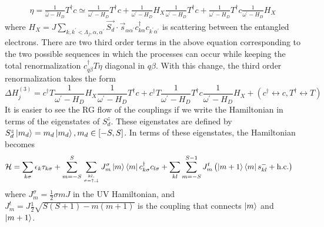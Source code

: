 \documentclass[reprint,prb,superscriptaddress]{revtex4-2}
\begin{document}
\begin{widetext}
\begin{equation}\begin{aligned}
	\eta = \frac{1}{\hat \omega - H_D}T^\dagger c \simeq \frac{1}{\omega^\prime - H_D}T^\dagger c + \frac{1}{\omega^\prime - H_D}H_X \frac{1}{\omega^\prime - H_D} T^\dagger c + \frac{1}{\omega^\prime - H_D} T^\dagger c \frac{1}{\omega^\prime - H_D} H_X
\end{aligned}\end{equation}
where \(H_X = J \sum_{k,k^\prime < \Lambda_j, \alpha,\alpha^\prime}\vec{S_d}\cdot\vec{s}_{\alpha \alpha^\prime}c^\dagger_{k\alpha}c_{k^\prime\alpha^\prime}\) is scattering between the entangled electrons. There are two third order terms in the above equation corresponding to the two possible sequences in which the processes can occur while keeping the total renormalization \(c^\dagger_{q\beta}T \eta\) diagonal in \(q\beta\). With this change, the third order renormalization takes the form
\begin{equation}
	\Delta H^{(3)}_j = c^\dagger T \frac{1}{\omega^\prime - H_D} H_X \frac{1}{\omega^\prime - H_D} T^\dagger c + c^\dagger T \frac{1}{\omega^\prime - H_D} T^\dagger c \frac{1}{\omega^\prime - H_D} H_X + \left(c^\dagger \leftrightarrow c, T^\dagger \leftrightarrow T\right)
\end{equation}
It is easier to see the RG flow of the couplings if we write the Hamiltonian in terms of the eigenstates of \(S_d^z\). These eigenstates are defined by \(S_d^z\ket{m_d} = m_d\ket{m_d}, m_d \in \left[-S, S\right]\). In terms of these eigenstates, the Hamiltonian becomes
\begin{equation}\begin{aligned}
	\mathcal{H} &= \sum_{k\sigma}\epsilon_{k}\tau_{k\sigma} + \sum_{m=-S}^S \sum_{kl,\atop{\sigma=\uparrow,\downarrow}} J^\sigma_m \ket{m}\bra{m} c^\dagger_{k \sigma}c_{l \sigma} + \sum_{kl} \sum_{m=-S}^{S-1} J^t_{m} \left(\ket{m+1}\bra{m} s^-_{kl}  + \text{h.c.}\right)
\end{aligned}\end{equation}
where \(J^\sigma_m = \frac{1}{2} \sigma m J\) in the UV Hamiltonian, and \(J^t_{m} = J\frac{1}{2}\sqrt{S(S+1) - m(m+1)}\) is the coupling that connects \(\ket{m}\) and \(\ket{m+1}\).


\end{widetext}

\end{document}
